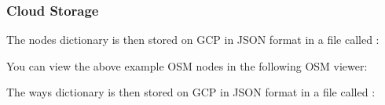 \documentclass[letterpaper,10pt,english]{sphinxmanual}
\begin{document}
\subsubsection{Cloud Storage}
\label{\detokenize{microservices/map_preprocessing/map_preprocessing:cloud-storage}}
The nodes dictionary is then stored on GCP in JSON format in a file called :

\begin{sphinxVerbatim}[commandchars=\\\{\}]
      \PYG{p}{[}
      \PYG{p}{]}
      \PYG{p}{[}
      \PYG{p}{]}
\end{sphinxVerbatim}

You can view the above example OSM nodes in the following OSM viewer:  

The ways dictionary is then stored on GCP in JSON format in a file called :
\end{document}
